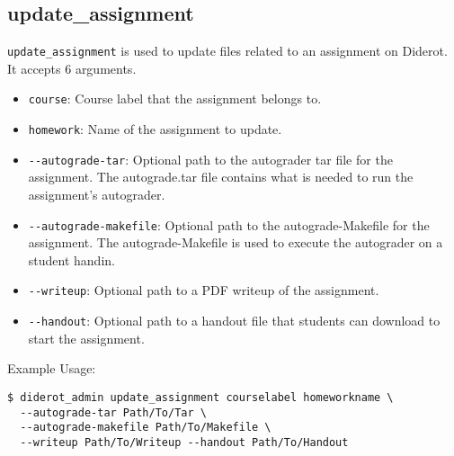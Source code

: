 \subsection{update\_assignment}

\verb|update_assignment| is used to update files related to an assignment on Diderot.
%
It accepts 6 arguments.

\begin{itemize}
  \item \verb|course|: Course label that the assignment belongs to.
  \item \verb|homework|: Name of the assignment to update.
  \item \verb|--autograde-tar|: Optional path to the autograder tar file for the assignment. The autograde.tar file contains what is needed to run the assignment's autograder.
  \item \verb|--autograde-makefile|: Optional path to the autograde-Makefile for the assignment. The autograde-Makefile is used to execute the autograder on a student handin.
  \item \verb|--writeup|: Optional path to a PDF writeup of the assignment.
  \item \verb|--handout|: Optional path to a handout file that students can download to start the assignment.
\end{itemize}

Example Usage:
\begin{verbatim}
$ diderot_admin update_assignment courselabel homeworkname \
  --autograde-tar Path/To/Tar \
  --autograde-makefile Path/To/Makefile \
  --writeup Path/To/Writeup --handout Path/To/Handout
\end{verbatim}
